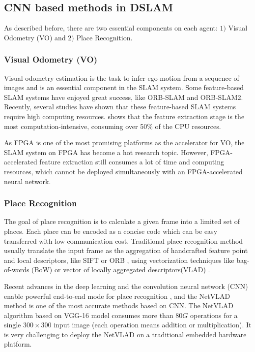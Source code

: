 \label{sec:background}
\subsection{CNN based methods in DSLAM}
As described before, there are two essential components on each agent: $1)$ Visual Odometry (VO) and $2)$ Place Recognition.

\subsubsection{Visual Odometry (VO)}

Visual odometry estimation is the task to infer ego-motion from a sequence of images and is an essential component in the SLAM system. Some feature-based SLAM systems have enjoyed great success, like ORB-SLAM\cite{DBLP:journals/trob/Mur-ArtalMT15} and ORB-SLAM2\cite{Mur-Artal:2017281}. Recently, several studies have shown that these feature-based SLAM systems require high computing resources. \cite{Fang2017FPGAbasedOF} shows that the feature extraction stage is the most computation-intensive, consuming over 50\% of the CPU resources.

As FPGA is one of the most promising platforms as the accelerator for VO, the SLAM system on FPGA has become a hot research topic. However, FPGA-accelerated feature extraction still consumes a lot of time and computing resources, which cannot be deployed simultaneously with an FPGA-accelerated neural network.

\subsubsection{Place Recognition}

The goal of place recognition is to calculate a given frame into a limited set of places. Each place can be encoded as a concise code which can be easy transferred with low communication cost. Traditional place recognition method usually translate the input frame as the aggregation of handcrafted feature point and local descriptors, like SIFT \cite{Lowe:2004e6e} or ORB \cite{Mur-Artal:2017281}, using vectorization techniques like bag-of-words (BoW) \cite{Galvez-Lopez:2012c94} or vector of locally aggregated descriptors(VLAD) \cite{Jegou:2010f45}.

Recent advances in the deep learning and the convolution neural network (CNN) enable powerful end-to-end mode for place recognition \cite{Noh:2017d0b, Arandjelovic:2017997}, and the NetVLAD method is one of the most accurate methods based on CNN. The NetVLAD algorithm based on VGG-16 model \cite{Simonyan:20143be} consumes more than $80G$ operations for a single $300 \times 300$ input image (each operation means addition or  multiplication). It is very challenging to deploy the NetVLAD on a traditional embedded hardware platform.

